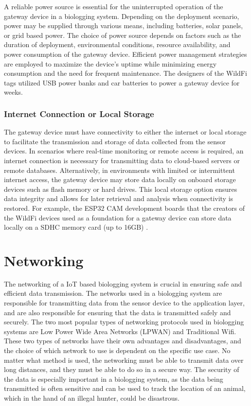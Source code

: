 \documentclass[sigplan,screen,nonacm]{acmart}
\begin{document}
A reliable power source is essential for the uninterrupted operation of the gateway device in a biologging system. 
Depending on the deployment scenario, power may be supplied through various means, including batteries, solar panels, 
or grid based power. The choice of power source depends on factors such as the duration of deployment, 
environmental conditions, resource availability, and power consumption of the gateway device. Efficient power management 
strategies are employed to maximize the device's uptime while minimizing energy consumption and the need for frequent 
maintenance. The designers of the WildFi tags utilized USB power banks and car batteries to power a gateway device for 
weeks\cite{wild2023internet}. 

\subsubsection{Internet Connection or Local Storage}
\label{subsubsec:Internet Connection or Local Storage}

The gateway device must have connectivity to either the internet or local storage to facilitate the transmission and 
storage of data collected from the sensor devices. In scenarios where real-time monitoring or remote access is required, 
an internet connection is necessary for transmitting data to cloud-based servers or remote databases. Alternatively, in 
environments with limited or intermittent internet access, the gateway device may store data locally on onboard storage 
devices such as flash memory or hard drives. This local storage option ensures data integrity and allows for later 
retrieval and analysis when connectivity is restored. For example, the ESP32 CAM development boards that the creators 
of the WildFi devices used as a foundation for a gateway device can store data locally on a SDHC memory card (up to 16GB) 
\cite{wild2023internet}.

\section{Networking}
\label{sec:Networking}

The networking of a IoT based biologging system is crucial in ensuring safe and
efficient data transmission. The networks used in a biologging system
are responsible for transmitting data from the sensor device to the application
layer, and are also responsible for ensuring that the data is transmitted
safely and securely. The two most popular types of networking protocols used in
biologging systems are Low Power Wide Area Networks (LPWAN) and Traditional Wifi.
These two types of networks have their own advantages and disadvantages, and
the choice of which network to use is dependent on the specific use case. No
matter what method is used, the networking must be able to transmit data over 
long distances, and they must be able to do so in a secure way. The security 
of the data is especially important in a biologging system, as the data being 
transmitted is often sensitive and can be used to track the location of an animal, 
which in the hand of an illegal hunter, could be disastrous.
\end{document}
